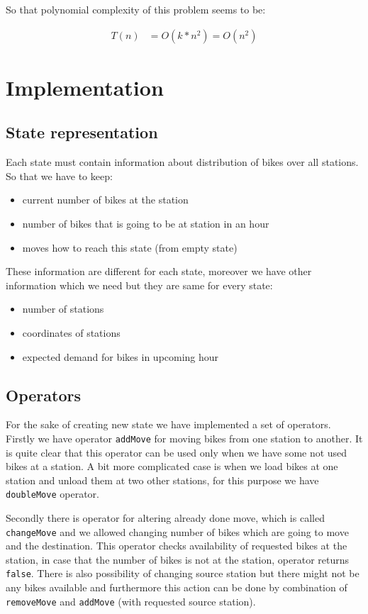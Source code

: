 \documentclass[11pt,twoside,a4paper]{mr}%
\begin{document}
So that polynomial complexity of this problem seems to be:

\begin{align}
 T(n) &= O( k* n^2 ) = O( n^2 )
\end{align}



\chapter{Implementation}
\section{State representation} 
Each state must contain information about distribution of bikes over all stations. So that we have to keep:
\begin{itemize}
\item current number of bikes at the station
\item number of bikes that is going to be at station in an hour 
\item moves how to reach this state (from empty state)
\end{itemize}
These information are different for each state, moreover we have other information which we need but they are same for every state:
\begin{itemize}
 \item number of stations
 \item coordinates of stations
 \item expected demand for bikes in upcoming hour
\end{itemize}


\section{Operators}
For the sake of creating new state we have implemented a set of operators. Firstly we have operator \texttt{addMove} for moving bikes from one station to another. It is quite clear that this operator can be used only when we have some not used bikes at a station. A bit more complicated case is when we load bikes at one station and unload them at two other stations, for this purpose we have \texttt{doubleMove} operator.

Secondly there is operator for altering already done move, which is called \texttt{changeMove} and we allowed changing number of bikes which are going to move and the destination. This operator checks availability of requested bikes at the station, in case that the number of bikes is not at the station, operator returns \texttt{false}. There is also possibility of changing source station but there might not be any bikes available and furthermore this action can be done by combination of \texttt{removeMove} and \texttt{addMove} (with requested source station).
\end{document}
